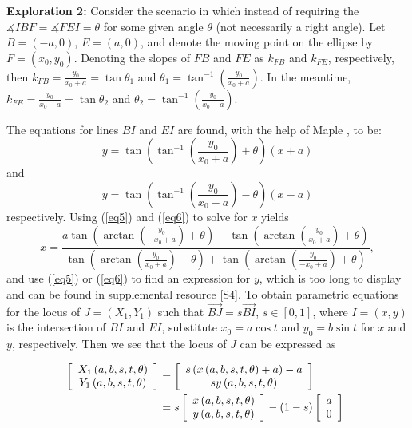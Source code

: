\documentclass[12pt,a4paper]{article}%
\begin{document}
\begin{enumerate}
\end{enumerate}

\textbf{Exploration 2:}
Consider the scenario in which instead of requiring the
$\measuredangle IBF=\measuredangle FEI=\theta$ for some given angle $\theta$
(not necessarily a right angle).
Let $B=(-a,0)$, $E=(a,0)$, and denote the moving point on the ellipse
by $F=(x_{0},y_{0})$. Denoting the slopes of $FB$ and $FE$
as $k_{FB}$ and $k_{FE}$, respectively, then
$k_{FB}=\frac{y_{0}}{x_{0}+a}=\tan\theta_{1}$
and
$\theta_{1}=\tan^{-1}\left(  \frac{y_{0}}{x_{0}+a}\right)$.
In the meantime, $k_{FE}=\frac{y_{0}}{x_{0}-a}=\tan\theta_{2}$
and $\theta_{2}=\tan^{-1}\left(  \frac{y_{0}}{x_{0}-a}\right)$.

The equations for lines $BI$ and $EI$ are found,
with the help of Maple \cite{Maple}, to be:
\begin{equation}
y=\tan\left(  \tan^{-1}\left(  \frac{y_{0}}{x_{0}+a}\right)  +\theta\right)
\left(  x+a\right) \label{eq5}
\end{equation}
and
\begin{equation}
y=\tan\left(  \tan^{-1}\left(  \frac{y_{0}}{x_{0}-a}\right)  -\theta\right)
\left(  x-a\right) \label{eq6}%
\end{equation}
respectively.
Using (\ref{eq5}) and (\ref{eq6}) to solve for $x$ yields
\[
x=\frac{a\tan\left(  \arctan\left(  \frac{y_{0}}{-x_{0}+a}\right)
+\theta\right)  -\tan\left(  \arctan\left(  \frac{y_{0}}{x_{0}+a}\right)
+\theta\right)  }{\tan\left(  \arctan\left(  \frac{y_{0}}{x_{0}+a}\right)
+\theta\right)  +\tan\left(  \arctan\left(  \frac{y_{0}}{-x_{0}+a}\right)
+\theta\right)  },
\]
and use (\ref{eq5}) or (\ref{eq6}) to find an expression for $y$,
which is too long to display and can be found in supplemental resource [S4].
To obtain parametric equations for the locus of $J=(X_1,Y_1)$ such that
$\overrightarrow{BJ} = s \overrightarrow{BI}$, $s\in[0,1]$,
where $I=(x,y)$ is the intersection of $BI$ and $EI$, substitute
$x_{0}=a\cos t$ and
$y_{0}=b\sin t$ for $x$ and $y$, respectively.
Then we see that the locus of $J$ can be expressed as

\begin{align*}
\left[
\begin{array}
[c]{c}%
X_{1}\left(  a,b,s,t,\theta\right) \\
Y_{1}\left(  a,b,s,t,\theta\right)
\end{array}
\right]
 & = \left[
\begin{array}
[c]{c}%
s\left(  x\left(  a,b,s,t,\theta\right)  +a\right)  -a\\
sy\left(  a,b,s,t,\theta\right)
\end{array}
\right] \\ 
 & = s\left[
\begin{array}
[c]{c}%
x\left(  a,b,s,t,\theta\right) \\
y\left(  a,b,s,t,\theta\right)
\end{array}
\right]  -\left(  1-s\right)  \left[
\begin{array}
[c]{c}%
a\\
0
\end{array}
\right]  .
\end{align*}
\end{document}
